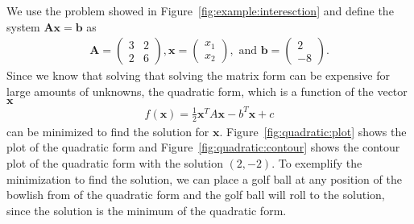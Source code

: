 \documentclass[11pt,fleqn]{book} %
\begin{document}
We use the problem showed in Figure~\ref{fig:example:interesction} and define the system $\mathbf{A} \mathbf{x} = \mathbf{b}$ as
\begin{align*}
\mathbf{A} = \begin{pmatrix}
 3 & 2 \\ 2 & 6 
\end{pmatrix}, \mathbf{x}=\begin{pmatrix}
x_1 \\ x_2  
\end{pmatrix}, \text{ and }  \mathbf{b}=\begin{pmatrix}
2 \\ -8  
\end{pmatrix}\text{.}
\end{align*}
Since we know that solving that solving the matrix form can be expensive for large amounts of unknowns, the quadratic form, which is a function of the vector $\mathbf{x}$
\begin{align}
f(\mathbf{x}) = \frac{1}{2} \mathbf{x}^T A \mathbf{x} - b^T \mathbf{x} + c
\end{align}
can be minimized to find the solution for $\mathbf{x}$. Figure~\ref{fig:quadratic:plot} shows the plot of the quadratic form and Figure~\ref{fig:quadratic:contour} shows the contour plot of the quadratic form with the solution $(2,-2)$. To exemplify  the minimization to find the solution, we can place a golf ball at any position of the bowlish from of the quadratic form and the golf ball will roll to the solution, since the solution is the minimum of the quadratic form.\\
\end{document}
